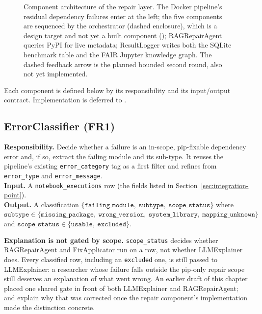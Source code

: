 \begin{figure}[t]
{%
  }
  \caption{Component architecture of the repair layer. The Docker pipeline's
           residual dependency failures enter at the left; the five
           components are sequenced by the orchestrator (dashed enclosure),
           which is a design target and not yet a built component
           (); RAGRepairAgent queries PyPI for live
           metadata; ResultLogger writes both the SQLite benchmark table and
           the FAIR Jupyter knowledge graph. The dashed feedback arrow is the
           planned bounded second round, also not yet implemented.}
  \label{fig:architecture-components}
\end{figure}

Each component is defined below by its responsibility and its input/output
contract. Implementation is deferred to .

\subsection{ErrorClassifier (FR1)}
\label{subsec:errorclassifier}
\textbf{Responsibility.} Decide whether a failure is an in-scope,
pip-fixable dependency error and, if so, extract the failing module and
its sub-type. It reuses the pipeline's existing \texttt{error\_category}
tag as a first filter and refines from \texttt{error\_type} and
\texttt{error\_message}.\\
\textbf{Input.} A \texttt{notebook\_executions} row (the fields listed in
Section~\ref{sec:integration-point}).\\
\textbf{Output.} A classification
$\{\texttt{failing\_module},\ \texttt{subtype},\ \texttt{scope\_status}\}$
where $\texttt{subtype} \in \{\texttt{missing\_package},\
\texttt{wrong\_version},\ \texttt{system\_library},\
\texttt{mapping\_unknown}\}$ and $\texttt{scope\_status} \in
\{\texttt{usable},\ \texttt{excluded}\}$.

\textbf{Explanation is not gated by scope.} \texttt{scope\_status} decides
whether RAGRepairAgent and FixApplicator run on a row, not whether
LLMExplainer does. Every classified row, including an \texttt{excluded} one,
is still passed to LLMExplainer: a researcher whose failure falls outside
the pip-only repair scope still deserves an explanation of what went wrong.
An earlier draft of this chapter placed one shared gate in front of both
LLMExplainer and RAGRepairAgent; \Cref{chap:problem-dataset} and
\Cref{chap:methodology} explain why that was corrected once the repair
component's implementation made the distinction concrete.

